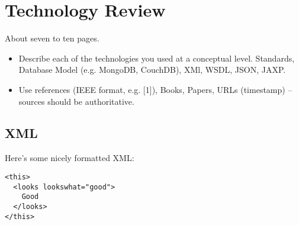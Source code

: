 \chapter{Technology Review}







About seven to ten pages.
\begin{itemize}
\item Describe each of the technologies you used at a conceptual level. Standards, Database Model (e.g. MongoDB, CouchDB), XMl, WSDL, JSON, JAXP.
\item Use references (IEEE format, e.g. [1]), Books, Papers, URLs (timestamp) – sources should be authoritative. 
\end{itemize}

\section{XML}
Here's some nicely formatted XML:
\begin{verbatim}
<this>
  <looks lookswhat="good">
    Good
  </looks>
</this>
\end{verbatim}

